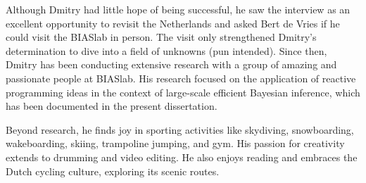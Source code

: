 Although Dmitry had little hope of being successful, he saw the interview as an excellent
opportunity to revisit the Netherlands and asked Bert de Vries if he could visit the BIASlab
in person.
The visit only strengthened Dmitry's determination to dive into a field of unknowns (pun
intended).
Since then, Dmitry has been conducting extensive research with a group of amazing and
passionate people at BIASlab.
His research focused on the application of reactive programming ideas in the context of
large-scale efficient Bayesian inference, which has been documented in the present
dissertation.

Beyond research, he finds joy in sporting activities like skydiving, snowboarding, wakeboarding, skiing,
trampoline jumping, and gym.
His passion for creativity extends to drumming and video editing.
He also enjoys reading and embraces the Dutch cycling culture, exploring its scenic routes.

